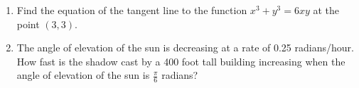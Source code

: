 \documentclass[11pt,fleqn]{article}
\newcommand{\be}{\begin{enumerate}}
\newcommand{\ee}{\end{enumerate}}
\begin{document}
\begin{enumerate}
  \vfill
  
  \vfill
  
  \vfill
  
\item Find the equation of the tangent line to the function $x^{3}+y^{3} = 6xy$ at the point $(3,3)$.

\vfill

\vfill

\item %
 The angle of elevation of the sun is decreasing at a rate of 0.25 radians/hour. How fast is the shadow cast by a 400 foot tall building increasing when the angle of elevation of the sun is $\frac{\pi}{6}$ radians?
 \vfill 
  
  

%

%    
%    
%    
%
%    
%  
%


\end{enumerate}
\end{document}
